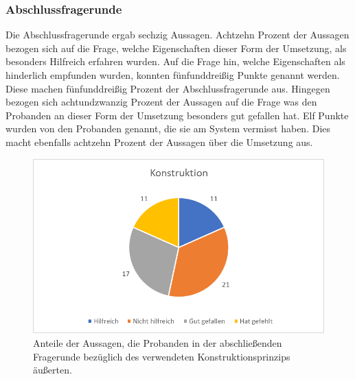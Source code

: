 \subsubsection{Abschlussfragerunde}
Die Abschlussfragerunde ergab sechzig Aussagen. Achtzehn Prozent der Aussagen bezogen sich auf die Frage, welche Eigenschaften dieser Form der Umsetzung, als besonders Hilfreich erfahren wurden. Auf die Frage hin, welche Eigenschaften als hinderlich empfunden wurden, konnten fünfunddreißig Punkte genannt werden. Diese machen fünfunddreißig Prozent der Abschlussfragerunde aus. Hingegen bezogen sich achtundzwanzig Prozent der Aussagen auf die Frage was den Probanden an dieser Form der Umsetzung besonders gut gefallen hat. Elf Punkte wurden von den Probanden genannt, die sie am System vermisst haben. Dies macht ebenfalls achtzehn Prozent der Aussagen über die Umsetzung aus. 

\begin{figure}[h]
\centering
\includegraphics[width=1\textwidth]{pictures/diagramme/aussagenkonstr}
\caption{Anteile der Aussagen, die Probanden in der abschließenden Fragerunde bezüglich des verwendeten Konstruktionsprinzips äußerten.}
\label{aussagensichtb}
\end{figure}


